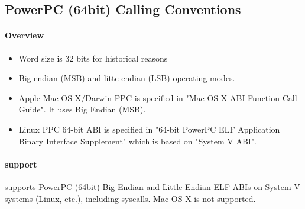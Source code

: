%
%
%
%

\subsection{PowerPC (64bit) Calling Conventions}

\paragraph{Overview}

\begin{itemize}
\item Word size is 32 bits for historical reasons
\item Big endian (MSB) and litte endian (LSB) operating modes.
\item Apple Mac OS X/Darwin PPC is specified in "Mac OS X ABI Function Call Guide"\cite{ppcMacOSX}. It uses Big Endian (MSB).
\item Linux PPC 64-bit ABI is specified in "64-bit PowerPC ELF Application Binary Interface Supplement"\cite{ppcelf64abi} which is based on "System V ABI".
\end{itemize}

\paragraph{ support}

 supports PowerPC (64bit) Big Endian and Little Endian ELF ABIs on System V systems (Linux, etc.), including syscalls. Mac OS X is not supported.


